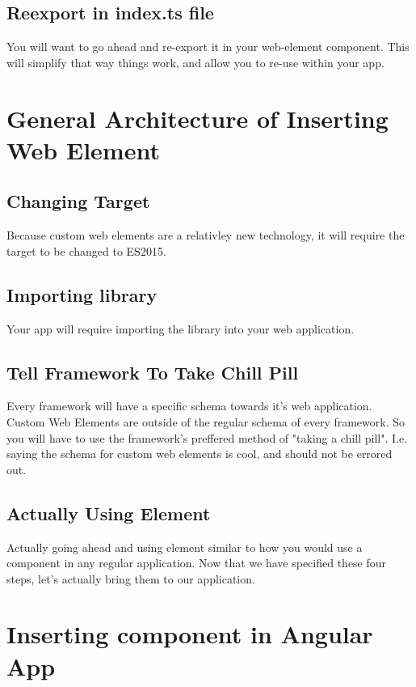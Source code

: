 
\subsection{Reexport in index.ts file}
You will want to go ahead and re-export it in your web-element component. This will simplify that way things work, and allow you to re-use within your app. 

\section{General Architecture of Inserting Web Element}
\subsection{Changing Target}
Because custom web elements are a relativley new technology, it will require the target to be changed to ES2015. 

\subsection{Importing library}
Your app will require importing the library into your web application.

\subsection{Tell Framework To Take Chill Pill}
Every framework will have a specific schema towards it's web application. Custom Web Elements are outside of the regular schema of every framework. So you will have to use the framework's preffered method of "taking a chill pill". I.e. saying the schema for custom web elements is cool, and should not be errored out.

\subsection{Actually Using Element}
Actually going ahead and using element similar to how you would use a component in any regular application. Now that we have specified these four steps, let's actually bring them to our application.

\section{Inserting component in Angular App}

